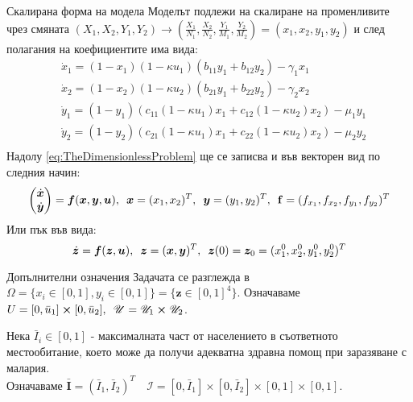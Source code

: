 \begin{frame}[t]{Скалирана форма на модела}
  Моделът подлежи на скалиране на променливите чрез смяната $(X_1, X_2, Y_1, Y_2) \rightarrow (\frac{X_1}{N_1}, \frac{X_2}{N_2}, \frac{Y_1}{M_1}, \frac{Y_2}{M_2}) = (x_1, x_2, y_1, y_2)$ и след полагания на коефициентите има вида:
  \begin{equation}
    \label{eq:TheDimensionlessProblem}
    \begin{split}
      &\dot{x}_1 = (1-x_1) (1-\kappa u_1) \left(b_{11} y_1 + b_{12} y_2\right) - \gamma_1 x_1 \\
      &\dot{x}_2 = (1-x_2) (1-\kappa u_2)\left(b_{21} y_1 + b_{22} y_2\right) - \gamma_2 x_2 \\
      &\dot{y}_1 = (1-y_1) \left(c_{11}(1-\kappa u_1) x_1 + c_{12}(1-\kappa u_2) x_2\right) - \mu_1 y_1 \\
      &\dot{y}_2 = (1-y_2) \left(c_{21}(1-\kappa u_1) x_1 + c_{22} (1-\kappa u_2) x_2\right) - \mu_2 y_2 \\
    \end{split}
  \end{equation}
  Надолу \eqref{eq:TheDimensionlessProblem} ще се записва и във векторен вид по следния начин:
  \begin{equation}
    \begin{pmatrix}
      \dot{\boldsymbol{x}} \\
      \dot{\boldsymbol{y}}
    \end{pmatrix}
    =
    \boldsymbol{f}(\boldsymbol{x}, \boldsymbol{y}, \boldsymbol{u}), \hspace{0.5em}
    \boldsymbol{x} = (x_1, x_2)^T, \hspace{0.5em} \boldsymbol{y} = (y_1, y_2)^T, \hspace{0.5em} \mathbf{f}=(f_{x_1}, f_{x_2}, f_{y_1}, f_{y_2})^T
  \end{equation}
  Или пък във вида:
  \begin{equation}
    \dot{\boldsymbol{z}} = \boldsymbol{f}(\boldsymbol{z}, \boldsymbol{u}), \hspace{0.5em} \boldsymbol{z} = (\boldsymbol{x}, \boldsymbol{y})^T, \hspace{0.5em} \boldsymbol{z}(0) = \boldsymbol{z}_0 = (x_1^0, x_2^0, y_1^0, y_2^0)^T
  \end{equation}
\end{frame}

\begin{frame}{Допълнителни означения}
  Задачата се разглежда в $\Omega = \{x_i \in [0, 1], y_i \in [0, 1]\} = \{\boldsymbol{z} \in [0, 1]^4\}$.
  Означаваме $U = [0, \bar{u}_1] \cross [0, \bar{u}_2], \hspace{0.5em} \mathscr{U} = \mathscr{U}_1 \cross \mathscr{U}_2$.

  Нека $\bar{I}_i \in [0, 1]$ - максималната част от населението в съответното местообитание, което може да получи адекватна здравна помощ при заразяване с малария. \\
  Означаваме $\bar{\boldsymbol{I}} = (\bar{I}_1, \bar{I}_2)^T \quad \mathscr{I} = [0, \bar{I}_1] \times [0, \bar{I}_2] \times [0, 1] \times [0, 1]$.

\end{frame}
